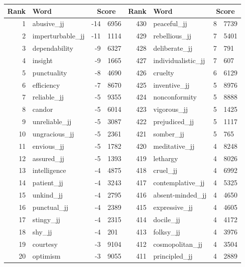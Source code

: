 \begin{table}[tbp]
    \begin{tabular}{| rlr@{.}l | rlr@{.}l |}
    \hline
    \textbf{Rank} & \textbf{Word} & \multicolumn{2}{c|}{\textbf{Score}} & \textbf{Rank} & \textbf{Word} & \multicolumn{2}{c|}{\textbf{Score}} \\
    \hline
    1 & abusive\_jj & -14 & 6956    &    430 & peaceful\_jj & 8 & 7739 \\
    2 & imperturbable\_jj & -11 & 1114    &    429 & rebellious\_jj & 7 & 5401 \\
    3 & dependability & -9 & 6327    &    428 & deliberate\_jj & 7 & 791 \\
    4 & insight & -9 & 1665    &    427 & individualistic\_jj & 7 & 607 \\
    5 & punctuality & -8 & 4690    &    426 & cruelty & 6 & 6129 \\
    6 & efficiency & -7 & 8670    &    425 & inventive\_jj & 5 & 8976 \\
    7 & reliable\_jj & -5 & 9355    &    424 & nonconformity & 5 & 8888 \\
    8 & candor & -5 & 6014    &    423 & vigorous\_jj & 5 & 1425 \\
    9 & unreliable\_jj & -5 & 3087    &    422 & prejudiced\_jj & 5 & 1117 \\
    10 & ungracious\_jj & -5 & 2361    &    421 & somber\_jj & 5 & 765 \\
    11 & envious\_jj & -5 & 1782    &    420 & meditative\_jj & 4 & 8248 \\
    12 & assured\_jj & -5 & 1393    &    419 & lethargy & 4 & 8026 \\
    13 & intelligence & -4 & 4875    &    418 & cruel\_jj & 4 & 6992 \\
    14 & patient\_jj & -4 & 3243    &    417 & contemplative\_jj & 4 & 5325 \\
    15 & unkind\_jj & -4 & 2795    &    416 & absent-minded\_jj & 4 & 4650 \\
    16 & punctual\_jj & -4 & 2389    &    415 & expressive\_jj & 4 & 4605 \\
    17 & stingy\_jj & -4 & 2315    &    414 & docile\_jj & 4 & 4172 \\
    18 & shy\_jj & -4 & 201    &    413 & folksy\_jj & 4 & 3976 \\
    19 & courtesy & -3 & 9104    &    412 & cosmopolitan\_jj & 4 & 3504 \\
    20 & optimism & -3 & 9055    &    411 & principled\_jj & 4 & 2889 \\

\end{tabular}
\end{table}

